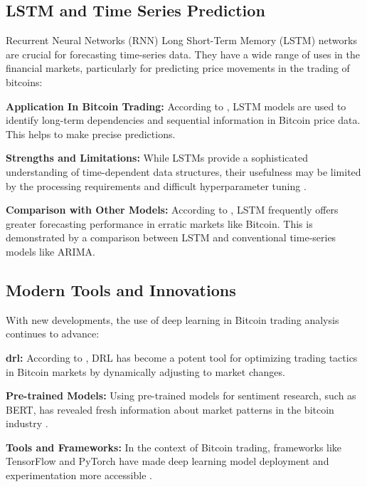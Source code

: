 \subsection{LSTM and Time Series Prediction}
\goodbreak

Recurrent Neural Networks (RNN) Long Short-Term Memory (LSTM) networks are crucial for forecasting time-series data. They have a wide range of uses in the financial markets, particularly for predicting price movements in the trading of bitcoins:

\textbf{Application In Bitcoin Trading:} According to \cite{DBLP:conf/nips/SutskeverVL14}, LSTM models are used to identify long-term dependencies and sequential information in Bitcoin price data. This helps to make precise predictions.


\textbf{Strengths and Limitations:} While LSTMs provide a sophisticated understanding of time-dependent data structures, their usefulness may be limited by the processing requirements and difficult hyperparameter tuning \citep{DBLP:journals/corr/ChungGCB14}.


\textbf{Comparison with Other Models:} According to \cite{DBLP:journals/neco/GersSC00}, LSTM frequently offers greater forecasting performance in erratic markets like Bitcoin. This is demonstrated by a comparison between LSTM and conventional time-series models like ARIMA.

\subsection{Modern Tools and Innovations} 

\goodbreak

With new developments, the use of deep learning in Bitcoin trading analysis continues to advance:

\textbf{\gls{drl}: }According to \cite{DBLP:journals/nature/MnihKSRVBGRFOPB15}, DRL has become a potent tool for optimizing trading tactics in Bitcoin markets by dynamically adjusting to market changes.

\textbf{Pre-trained Models:} Using pre-trained models for sentiment research, such as BERT, has revealed fresh information about market patterns in the bitcoin industry \citep{DBLP:journals/corr/abs-1810-04805}.

\textbf{Tools and Frameworks:} In the context of Bitcoin trading, frameworks like TensorFlow and PyTorch have made deep learning model deployment and experimentation more accessible \citep{DBLP:journals/corr/AbadiABBCCCDDDG16}\citep{DBLP:journals/corr/abs-1912-01703}.

